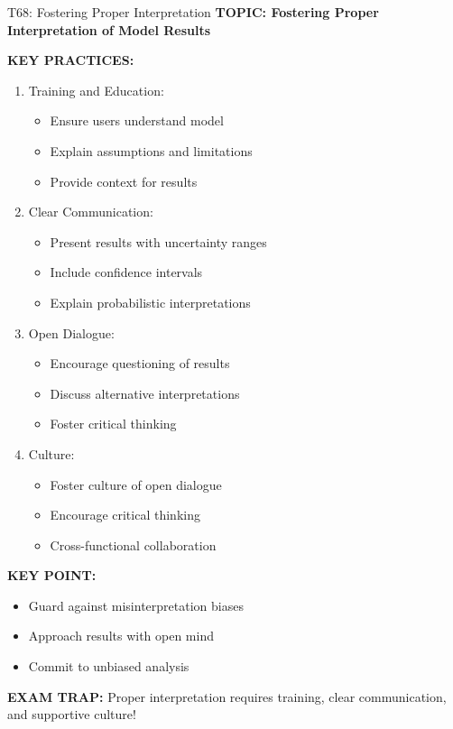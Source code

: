 \documentclass[8pt]{beamer}
\begin{document}
	\begin{frame}{T68: Fostering Proper Interpretation}
		\fontsize{6.5}{7.5}\selectfont
		\textbf{TOPIC: Fostering Proper Interpretation of Model Results}
		
		\vspace{0.1cm}
		\textbf{KEY PRACTICES:}
		\begin{enumerate}
			\item \textcolor{myblue}{Training and Education:}
			\begin{itemize}
				\item Ensure users understand model
				\item Explain assumptions and limitations
				\item Provide context for results
			\end{itemize}
			\item \textcolor{myblue}{Clear Communication:}
			\begin{itemize}
				\item Present results with uncertainty ranges
				\item Include confidence intervals
				\item Explain probabilistic interpretations
			\end{itemize}
			\item \textcolor{myblue}{Open Dialogue:}
			\begin{itemize}
				\item Encourage questioning of results
				\item Discuss alternative interpretations
				\item Foster critical thinking
			\end{itemize}
			\item \textcolor{myblue}{Culture:}
			\begin{itemize}
				\item Foster culture of open dialogue
				\item Encourage critical thinking
				\item Cross-functional collaboration
			\end{itemize}
		\end{enumerate}
		
		\vspace{0.1cm}
		\textbf{KEY POINT:}
		\begin{itemize}
			\item Guard against misinterpretation biases
			\item Approach results with open mind
			\item Commit to unbiased analysis
		\end{itemize}
		
		\textcolor{myred}{\textbf{EXAM TRAP:}} Proper interpretation requires \textcolor{myblue}{training, clear communication, and supportive culture}!
	\end{frame}
	
\end{document}

